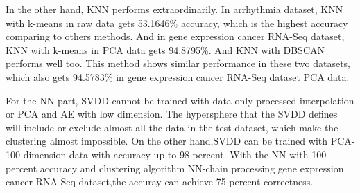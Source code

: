 \documentclass[twocolumn,10pt]{article}
\begin{document}
  In the other hand, KNN performs extraordinarily. In arrhythmia dataset, KNN with k-means in raw data gets 53.1646\% 
  accuracy, which is the highest accuracy comparing to others methods. And in gene expression cancer RNA-Seq dataset, 
  KNN with k-means in PCA data gets 94.8795\%. And KNN with DBSCAN performs well too. This method shows similar performance 
  in these two datasets, which also gets 94.5783\% in gene expression cancer RNA-Seq dataset PCA data. 

  For the NN part, SVDD cannot be trained with data only processed interpolation or PCA and AE with low dimension. The hypersphere that the SVDD defines will include or exclude almost all the data in the test dataset, which make the clustering almost impossible.
  On the other hand,SVDD can be trained with PCA-100-dimension data with accuracy up to 98 percent. With the NN with 100 percent accuracy and clustering algorithm NN-chain processing gene expression cancer RNA-Seq dataset,the accuray can achieve 75 percent correctness.
\end{document}

